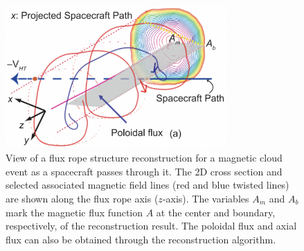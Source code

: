 \begin{figure}
    \centering
    \includegraphics[width=0.75\textwidth]{Figures/Hu2017_5a.png}
    \caption[2D cross section view of a flux rope structure reconstruction] {View of a flux rope structure reconstruction for a magnetic cloud event \citep{Hu:2015} as a spacecraft passes through it. The 2D cross section and selected associated magnetic field lines (red and blue twisted lines) are shown along the flux rope axis ($z$-axis). The variables $A_m$ and $A_b$ mark the magnetic flux function $A$ at the center and boundary, respectively, of the reconstruction result. The poloidal flux and axial flux can also be obtained through the reconstruction algorithm.} %
    \label{fig:GSreconstruction_Hu2017}
\end{figure}

